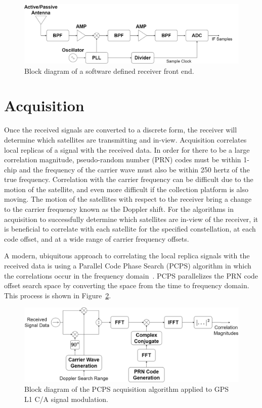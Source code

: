 \begin{figure}[!ht]\label{fig:frontend}
    \centering
    \includegraphics[width=\linewidth]{Figures/frontend.drawio.png}
    \caption{Block diagram of a software defined receiver front end.}
\end{figure}

\section{Acquisition}
Once the received signals are converted to a discrete form, the receiver will determine which satellites are transmitting and in-view. Acquisition correlates local replicas of a signal with the received data. In order for there to be a large correlation magnitude, pseudo-random number (PRN) codes must be within 1-chip and the frequency of the carrier wave must also be within 250 hertz of the true frequency. Correlation with the carrier frequency can be difficult due to the motion of the satellite, and even more difficult if the collection platform is also moving. The motion of the satellites with respect to the receiver bring a change to the carrier frequency known as the Doppler shift. For the algorithms in acquisition to successfully determine which satellites are in-view of the receiver, it is beneficial to correlate with each satellite for the specified constellation, at each code offset, and at a wide range of carrier frequency offsets.

A modern, ubiquitous approach to correlating the local replica signals with the received data is using a Parallel Code Phase Search (PCPS) algorithm in which the correlations occur in the frequency domain~\cite{scottRapidSignalAcquisition}. PCPS parallelizes the PRN code offset search space by converting the space from the time to frequency domain. This process is shown in Figure~\ref{fig:PCPS}.

\begin{figure}[!ht]\label{fig:PCPS}
    \centering
    \includegraphics[width=\linewidth]{Figures/PCPS.drawio.png}
    \caption{Block diagram of the PCPS acquisition algorithm applied to GPS L1 C/A signal modulation.}
\end{figure}

